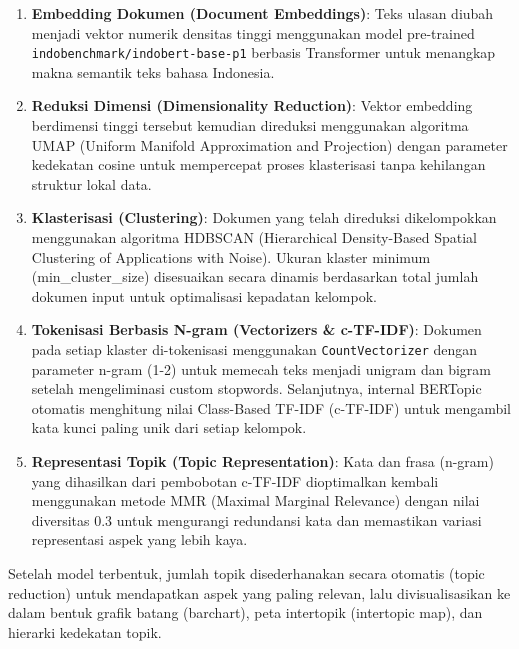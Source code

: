 \begin{enumerate}
    \item \textbf{Embedding Dokumen (Document Embeddings)}: Teks ulasan diubah menjadi vektor numerik densitas tinggi menggunakan model pre-trained \texttt{indobenchmark/}\allowbreak\texttt{indobert-base-p1} berbasis Transformer untuk menangkap makna semantik teks bahasa Indonesia.
    \item \textbf{Reduksi Dimensi (Dimensionality Reduction)}: Vektor embedding berdimensi tinggi tersebut kemudian direduksi menggunakan algoritma UMAP (Uniform Manifold Approximation and Projection) dengan parameter kedekatan cosine untuk mempercepat proses klasterisasi tanpa kehilangan struktur lokal data.
    \item \textbf{Klasterisasi (Clustering)}: Dokumen yang telah direduksi dikelompokkan menggunakan algoritma HDBSCAN (Hierarchical Density-Based Spatial Clustering of Applications with Noise). Ukuran klaster minimum (min\_cluster\_size) disesuaikan secara dinamis berdasarkan total jumlah dokumen input untuk optimalisasi kepadatan kelompok.
    \item \textbf{Tokenisasi Berbasis N-gram (Vectorizers \& c-TF-IDF)}: Dokumen pada setiap klaster di-tokenisasi menggunakan \texttt{CountVectorizer} dengan parameter n-gram (1-2) untuk memecah teks menjadi unigram dan bigram setelah mengeliminasi custom stopwords. Selanjutnya, internal BERTopic otomatis menghitung nilai Class-Based TF-IDF (c-TF-IDF) untuk mengambil kata kunci paling unik dari setiap kelompok.
    \item \textbf{Representasi Topik (Topic Representation)}: Kata dan frasa (n-gram) yang dihasilkan dari pembobotan c-TF-IDF dioptimalkan kembali menggunakan metode MMR (Maximal Marginal Relevance) dengan nilai diversitas 0.3 untuk mengurangi redundansi kata dan memastikan variasi representasi aspek yang lebih kaya.
\end{enumerate}

Setelah model terbentuk, jumlah topik disederhanakan secara otomatis (topic reduction) untuk mendapatkan aspek yang paling relevan, lalu divisualisasikan ke dalam bentuk grafik batang (barchart), peta intertopik (intertopic map), dan hierarki kedekatan topik.

